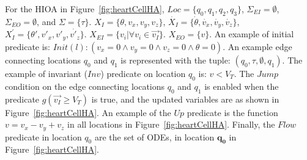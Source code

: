 For the \ac{HIOA} in Figure~\ref{fig:heartCellHA},
$Loc=\{q_{0},q_{1},q_{2},q_{3}\}$, $\Sigma_{EI} = \emptyset$,
$\Sigma_{EO}=\emptyset$, and
$\Sigma=\{\tau\}$. \mbox{$X_{I}=\{\theta,v_{x},v_{y},v_{z}\}$},
\mbox{$\dot{X_{I}}=\{\dot{\theta},\dot{v_{x}},\dot{v_{y}},\dot{v_{z}}\}$},
\mbox{$X^{\prime}_{I}=\{\theta',{v'_{x}},{v'_{y}},\dot{v'_{z}}\}$}.
$X_{EI}=\{v_{i}| \forall v_{i} \in \vec{v_{I}}\}$. $X_{EO}=\{v\}$. An
example of initial predicate is: 
\mbox{$Init(l): (v_{x}=0 \wedge v_{y}=0 \wedge v_{z}=0 \wedge \theta=0)$}. An
example edge connecting locations $q_{0}$ and $q_{1}$ is represented
with the tuple: $(q_{0},\tau,\emptyset,q_{1})$. The example of invariant
($Inv$) predicate on location $q_{0}$ is: $v < V_{T}$. The $Jump$ condition on
the edge connecting locations $q_{0}$ and $q_{1}$ is enabled when the
predicate \mbox{$g(\vec{v_{I}} \geq V_{T})$} is true, and the updated
variables are as shown in Figure~\ref{fig:heartCellHA}. An example of
the $Up$ predicate is the function $v = v_{x} - v_{y} + v_{z}$ in all
locations in Figure~\ref{fig:heartCellHA}. Finally, the $Flow$ predicate
in location $q_{0}$ are the set of \acp{ODE}, in location
$\mathbf{q_{0}}$ in Figure~\ref{fig:heartCellHA}.




